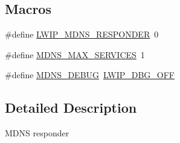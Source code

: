 \subsection*{Macros}
\begin{DoxyCompactItemize}
\item 
\#define \hyperlink{group__mdns__opts_gac94cc7a48fb5352f49a9e00594e89ea8}{L\+W\+I\+P\+\_\+\+M\+D\+N\+S\+\_\+\+R\+E\+S\+P\+O\+N\+D\+ER}~0
\item 
\#define \hyperlink{group__mdns__opts_ga82749ee08be21967b6daf577b9710ac6}{M\+D\+N\+S\+\_\+\+M\+A\+X\+\_\+\+S\+E\+R\+V\+I\+C\+ES}~1
\item 
\#define \hyperlink{group__mdns__opts_ga53a97502efdcf1214cab4078f93a6dc9}{M\+D\+N\+S\+\_\+\+D\+E\+B\+UG}~\hyperlink{group__debugging__levels_gadab1cdc3f45939a3a5c9a3d7e04987e1}{L\+W\+I\+P\+\_\+\+D\+B\+G\+\_\+\+O\+FF}
\end{DoxyCompactItemize}


\subsection{Detailed Description}
M\+D\+NS responder 